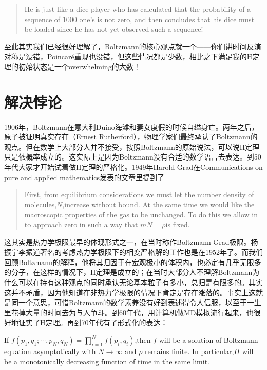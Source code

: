 \begin{quote}
	He is just like a dice player who has calculated that the probability of a sequence of 1000 one's is not zero, and then concludes that his dice must be loaded since he has not yet observed such a sequence!
\end{quote}

至此其实我们已经很好理解了，Boltzmann的核心观点就一个——你们讲时间反演对称是没错，Poincaré重现也没错，但这些情况都是少数，相比之下满足我的H定理的初始状态是一个overwhelming的大数！

\section{解决悖论}

1906年，Boltzmann在意大利Duino海滩和妻女度假的时候自缢身亡。两年之后，原子被证明真实存在（Ernest Rutherford），物理学家们最终承认了Boltzmann的观点。但在数学上大部分人并不接受，按照Boltzmann的原始说法，可以说H定理只是依概率成立的。这实际上是因为Boltzmann没有合适的数学语言去表达。到50年代大家才开始试着做H定理的严格化。1949年Harold Grad在Communications on pure and applied mathematics发表的文章里提到了\cite{3}

\begin{quote}
	First, from equilibrium considerations we must let the number density of molecules,$N$,increase without bound. At the same time we would like the macroscopic properties of the gas to be unchanged. To do this we allow in to approach zero in such a way that $mN=\rho$is fixed.
\end{quote}

这其实是热力学极限最早的体现形式之一，在当时称作Boltzmann-Grad极限。杨振宁李振道著名的考虑热力学极限下的相变严格解的工作也是在1952年了。而我们回顾Boltzmann的解释，他将其归因于在宏观极小的体积内，也必定有几乎无限多的分子，在这样的情况下，H定理是成立的；在当时大部分人不理解Boltzmann为什么可以在持有这种观点的同时承认无论基本粒子有多小，总归是有限多的。其实这并不矛盾，因为他知道在非热力学极限的情况下肯定是存在涨落的。事实上这就是同一个意思，可惜Boltzmann的数学素养没有好到表述得令人信服，以至于一生里花掉大量的时间去为与人争斗。到60年代，用计算机做MD模拟流行起来，也很好地证实了H定理。再到70年代有了形式化的表达：

If $f(p_1,q_1;\cdots,p_N,q_N)=\prod_{i=1}^N f(p_i,q_i)$,then $f$ will be a solution of Boltzmann equation asymptotically with  $N \rightarrow \infty$ and $\rho$ remains finite. In particular,$H$ will be a monotonically decreasing function of time in the same limit.

